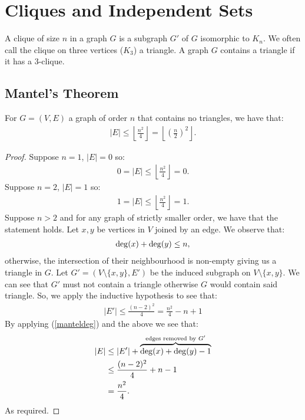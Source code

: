 \section{Cliques and Independent Sets}

A clique of size $n$ in a graph $G$ is a subgraph $G'$ of $G$ isomorphic
to $K_n$.
We often call the clique on three vertices ($K_3$) a triangle. 
A graph $G$ contains a triangle if it has a $3$-clique.

\subsection{Mantel's Theorem}

For $G = (V, E)$ a graph of order $n$ that contains no triangles, we have that: \begin{gather*}
  |E| \leq \left\lfloor \frac{n^2}{4} \right\rfloor = \left\lfloor \left(\frac{n}{2}\right)^2 \right\rfloor.
\end{gather*}
\begin{proof}
    Suppose $n = 1$, $|E| = 0$ so: \begin{gather*}
        0 = |E| \leq \left\lfloor \frac{n^2}{4} \right\rfloor = 0.
    \end{gather*}
    Suppose $n = 2$, $|E| = 1$ so: \begin{gather*}
        1 = |E| \leq \left\lfloor \frac{n^2}{4} \right\rfloor = 1.
    \end{gather*}
    Suppose $n > 2$ and for any graph of strictly smaller order, we have that
    the statement holds. Let $x, y$ be vertices in $V$ joined by an edge. We
    observe that: \begin{gather} \label{manteldeg}
        \operatorname{deg}(x) + \operatorname{deg}(y) \leq n,
    \end{gather} otherwise, the intersection of their neighbourhood is 
    non-empty giving us a triangle in $G$. Let $G' = (V \setminus \{x, y\}, E')$ 
    be the induced subgraph on $V \setminus \{x, y\}$. We can see that 
    $G'$ must not contain a triangle otherwise $G$ would contain said triangle.
    So, we apply the inductive hypothesis to see that: \begin{gather}
        |E'| \leq \frac{(n - 2)^2}{4} = \frac{n^2}{4} - n + 1
    \end{gather} 
    By applying (\ref{manteldeg}) and the above we see that: \begin{align*}
        |E| &\leq |E'| +
        \overbrace{\operatorname{deg}(x) + \operatorname{deg}(y) - 1}^\text{edges removed by $G'$} \\
        &\leq \frac{(n - 2)^2}{4} + n - 1 \\
        &= \frac{n^2}{4}.
    \end{align*} As required.
\end{proof}

